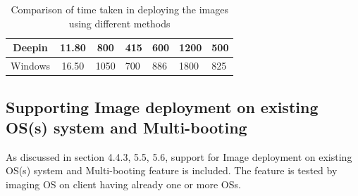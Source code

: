 \documentclass[a4paper,12pt]{article}
\begin{document}
\begin{table}[H]
\begin{tabular}{|c|c|c|l|l|l|l|}
Deepin       & 11.80                                                                 & 800                                                                       & 415                                                                               & 600                                                                         & 1200                                                                             & 500                                                                          \\ \hline
Windows      & 16.50                                                                 & 1050                                                                      & 700                                                                               & 886                                                                         & 1800                                                                             & 825                                                                          \\ \hline
\end{tabular}
\caption {Comparison of time taken in deploying the images using different methods} 
\label{imaging}
\end{table}
\subsection{ Supporting Image deployment on existing OS(s) system and Multi-booting }
As discussed in section 4.4.3, 5.5, 5.6, support for Image deployment on existing OS(s) system and Multi-booting feature is included. The feature is tested by imaging OS on client having already one or more OSs.
\end{document}
